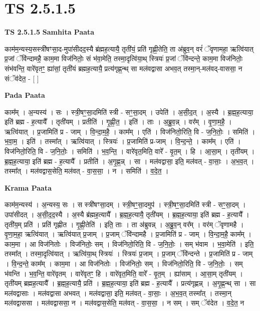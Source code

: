 \documentclass[17pt]{extarticle}
\begin{document}
\section*{ TS 2.5.1.5 }

\textbf{TS 2.5.1.5 } \newline
\textbf{Samhita Paata} \newline

काम॑म॒न्यस्य॒सस्त्री॑षꣳसा॒द-मुपा॑सीदद॒स्यै ब्र॑ह्मह॒त्यायै॒ तृती॑यं॒ प्रति॑ गृह्णी॒तेति॒ ता अ॑ब्रुव॒न् वरं॑ ॅवृणामहा॒ ऋत्वि॑यात् प्र॒जां ॅवि॑न्दामहै॒ काम॒मा विज॑नितोः॒ सं भ॑वा॒मेति॒ तस्मा॒दृत्वि॑या॒थ् स्त्रियः॑ प्र॒जां ॅवि॑न्दन्ते॒ काम॒मा विज॑नितोः॒ संभ॑वन्ति॒ वारे॑वृतꣳ॒॒ ह्या॑सां॒ तृती॑यं ब्रह्मह॒त्यायै॒ प्रत्य॑गृह्ण॒न्थ् सा मल॑वद्वासा अभव॒त् तस्मा॒न्-मल॑वद्-वाससा॒ न संॅव॑देत॒ - [  ] \newline

\textbf{Pada Paata} \newline

काम᳚म् । अ॒न्यस्य॑ । सः । स्त्री॒षꣳ॒॒सा॒दमिति॑ स्त्री - सꣳ॒॒सा॒दम् । उपेति॑ । अ॒सी॒द॒त् । अ॒स्यै । ब्र॒ह्म॒ह॒त्याया॒ इति॑ ब्रह्म - ह॒त्यायै᳚ । तृती॑यम् । प्रतीति॑ । गृ॒ह्णी॒त॒ । इति॑ । ताः । अ॒ब्रु॒व॒न्न् । वर᳚म् । वृ॒णा॒म॒है॒ । ऋत्वि॑यात् । प्र॒जामिति॑ प्र - जाम् । वि॒न्दा॒म॒है॒ । काम᳚म् । एति॑ । विज॑नितो॒रिति॒ वि - ज॒नि॒तोः॒ । समिति॑ । भ॒वा॒म॒ । इति॑ । तस्मा᳚त् । ऋत्वि॑यात् । स्त्रियः॑ । प्र॒जामिति॑ प्र-जाम् । वि॒न्द॒न्ते॒ । काम᳚म् । एति॑ । विज॑नितो॒रिति॒ वि - ज॒नि॒तोः॒ । समिति॑ । भ॒व॒न्ति॒ । वारे॑वृत॒मिति॒ वारे᳚ - वृ॒त॒म् । हि । आ॒सा॒म् । तृती॑यम् । ब्र॒ह्म॒ह॒त्याया॒ इति॑ ब्रह्म - ह॒त्यायै᳚ । प्रतीति॑ । अ॒गृ॒ह्ण॒न्न् । सा । मल॑वद्वासा॒ इति॒ मल॑वत् - वा॒साः॒ । अ॒भ॒व॒त् । तस्मा᳚त् । मल॑वद्वास॒सेति॒ मल॑वत् - वा॒स॒सा॒ । न । समिति॑ । व॒दे॒त॒ ।  \newline


\textbf{Krama Paata} \newline

काम॑म॒न्यस्य॑ । अ॒न्यस्य॒ सः । स स्त्री॑षꣳसा॒दम् । स्त्री॒षꣳ॒॒सा॒दमुप॑ । स्त्री॒षꣳ॒॒सा॒दमिति॑ स्त्री - सꣳ॒॒सा॒दम् । उपा॑सीदत् । अ॒सी॒द॒द॒स्यै । अ॒स्यै ब्र॑ह्मह॒त्यायै᳚ । ब्र॒ह्म॒ह॒त्यायै॒ तृती॑यम् । ब्र॒ह्म॒ह॒त्याया॒ इति॑ ब्रह्म - ह॒त्यायै᳚ । तृती॑य॒म् प्रति॑ । प्रति॑ गृह्णीत । गृ॒ह्णी॒तेति॑ । इति॒ ताः । ता अ॑ब्रुवन्न् । अ॒ब्रु॒व॒न् वर᳚म् । वर॑म् ॅवृणामहै । वृ॒णा॒म॒हा॒ ऋत्वि॑यात् । ऋत्वि॑यात् प्र॒जाम् । प्र॒जाम् ॅवि॑न्दामहै । प्र॒जामिति॑ प्र - जाम् । वि॒न्दा॒म॒है॒ काम᳚म् । काम॒मा । आ विज॑नितोः । विज॑नितोः॒ सम् । विज॑नितो॒रिति॒ वि - ज॒नि॒तोः॒ । सम् भ॑वाम । भ॒वा॒मेति॑ । इति॒ तस्मा᳚त् । तस्मा॒दृत्वि॑यात् । ऋत्वि॑या॒थ् स्त्रियः॑ । स्त्रियः॑ प्र॒जाम् । प्र॒जाम् ॅवि॑न्दन्ते । प्र॒जामिति॑ प्र - जाम् । वि॒न्द॒न्ते॒ काम᳚म् । काम॒मा । आ विज॑नितोः । विज॑नितोः॒ सम् । विज॑नितो॒रिति॒ वि - ज॒नि॒तोः॒ । सम् भ॑वन्ति । भ॒व॒न्ति॒ वारे॑वृतम् । वारे॑वृतꣳ॒॒ हि । वारे॑वृत॒मिति॒ वारे᳚ - वृ॒त॒म् । ह्या॑साम् । आ॒सा॒म् तृती॑यम् । तृती॑यम् ब्रह्मह॒त्यायै᳚ । ब्र॒ह्म॒ह॒त्यायै॒ प्रति॑ । ब्र॒ह्म॒ह॒त्याया॒ इति॑ ब्रह्म - ह॒त्यायै᳚ । प्रत्य॑गृह्णन्न् । अ॒गृ॒ह्ण॒न्थ् सा । सा मल॑वद्वासाः । मल॑वद्वासा अभवत् । मल॑वद्वासा॒ इति॒ मल॑वत् - वा॒साः॒ । अ॒भ॒व॒त् तस्मा᳚त् । तस्मा॒न् मल॑वद्वाससा । मल॑वद्वाससा॒ न । मल॑वद्वास॒सेति॒ मल॑वत् - वा॒स॒सा॒ । न सम् । सम् ॅव॑देत । व॒दे॒त॒ न \newline
\end{document}

